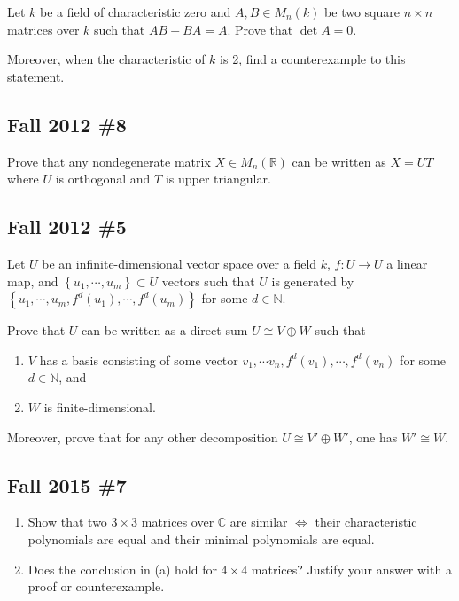 Let \(k\) be a field of characteristic zero and \(A, B \in M_n(k)\) be
two square \(n\times n\) matrices over \(k\) such that \(AB - BA = A\).
Prove that \(\operatorname{det}A = 0\).

Moreover, when the characteristic of \(k\) is 2, find a counterexample
to this statement.

\hypertarget{fall-2012-8}{%
\subsection{Fall 2012 \#8}\label{fall-2012-8}}

Prove that any nondegenerate matrix \(X\in M_n({\mathbb{R}})\) can be
written as \(X = UT\) where \(U\) is orthogonal and \(T\) is upper
triangular.

\hypertarget{fall-2012-5}{%
\subsection{Fall 2012 \#5}\label{fall-2012-5}}

Let \(U\) be an infinite-dimensional vector space over a field \(k\),
\(f: U\to U\) a linear map, and
\(\left\{{u_1, \cdots, u_m}\right\} \subset U\) vectors such that \(U\)
is generated by
\(\left\{{u_1, \cdots, u_m, f^d(u_1), \cdots, f^d(u_m)}\right\}\) for
some \(d\in {\mathbb{N}}\).

Prove that \(U\) can be written as a direct sum \(U \cong V\oplus W\)
such that

\begin{enumerate}
\def\labelenumi{\arabic{enumi}.}
\tightlist
\item
  \(V\) has a basis consisting of some vector
  \(v_1, \cdots v_n, f^d(v_1), \cdots, f^d(v_n)\) for some
  \(d\in {\mathbb{N}}\), and
\item
  \(W\) is finite-dimensional.
\end{enumerate}

Moreover, prove that for any other decomposition
\(U \cong V' \oplus W'\), one has \(W' \cong W\).

\hypertarget{fall-2015-7}{%
\subsection{Fall 2015 \#7}\label{fall-2015-7}}

\begin{enumerate}
\def\labelenumi{\alph{enumi}.}
\item
  Show that two \(3\times 3\) matrices over \({\mathbb{C}}\) are similar
  \(\iff\) their characteristic polynomials are equal and their minimal
  polynomials are equal.
\item
  Does the conclusion in (a) hold for \(4\times 4\) matrices? Justify
  your answer with a proof or counterexample.
\end{enumerate}

